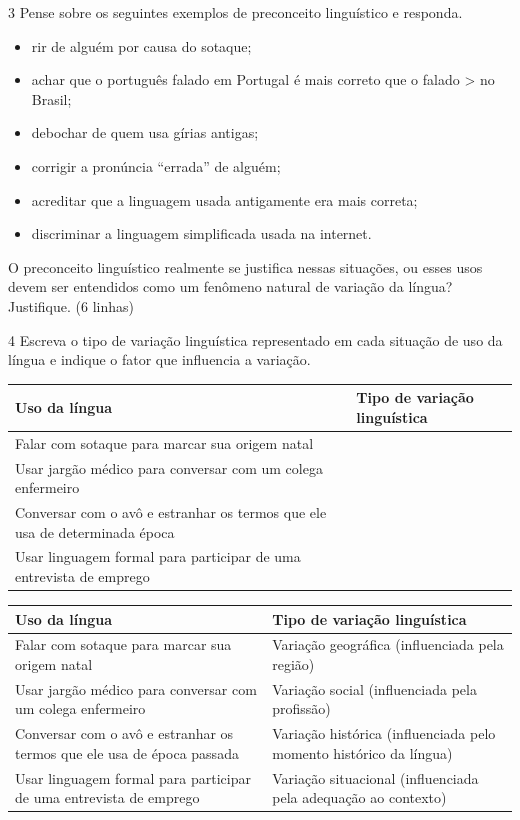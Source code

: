 \num{3} Pense sobre os seguintes exemplos de preconceito linguístico e
responda.

\begin{itemize}
\item
  rir de alguém por causa do sotaque;
\item
  achar que o português falado em Portugal é mais correto que o falado
  \textgreater{} no Brasil;
\item
  debochar de quem usa gírias antigas;
\item
  corrigir a pronúncia ``errada'' de alguém;
\item
  acreditar que a linguagem usada antigamente era mais correta;
\item
  discriminar a linguagem simplificada usada na internet.
\end{itemize}

O preconceito linguístico realmente se justifica nessas situações, ou
esses usos devem ser entendidos como um fenômeno natural de variação da
língua? Justifique. (6 linhas)


\num{4} Escreva o tipo de variação linguística representado em cada
situação de uso da língua e indique o fator que influencia a variação.

\begin{longtable}[]{@{}ll@{}}
\toprule
\textbf{Uso da língua} & \textbf{Tipo de variação
linguística}\tabularnewline
\midrule
\endhead
Falar com sotaque para marcar sua origem natal &\tabularnewline
Usar jargão médico para conversar com um colega enfermeiro
&\tabularnewline
Conversar com o avô e estranhar os termos que ele usa de determinada
época &\tabularnewline
Usar linguagem formal para participar de uma entrevista de emprego
&\tabularnewline
\bottomrule
\end{longtable}

\begin{longtable}[]{@{}ll@{}}
\toprule
\textbf{Uso da língua} & \textbf{Tipo de variação
linguística}\tabularnewline
\midrule
\endhead
Falar com sotaque para marcar sua origem natal & Variação geográfica
(influenciada pela região)\tabularnewline
Usar jargão médico para conversar com um colega enfermeiro & Variação
social (influenciada pela profissão)\tabularnewline
Conversar com o avô e estranhar os termos que ele usa de época passada &
Variação histórica (influenciada pelo momento histórico da
língua)\tabularnewline
Usar linguagem formal para participar de uma entrevista de emprego &
Variação situacional (influenciada pela adequação ao
contexto)\tabularnewline
\bottomrule
\end{longtable}

